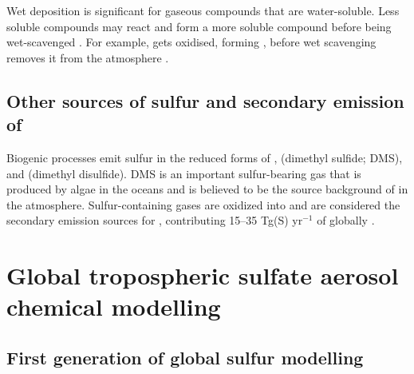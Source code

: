 Wet deposition is significant for gaseous compounds that are water-soluble. Less soluble compounds may react and form a more soluble compound before being wet-scavenged \citep{wayneChemistryAtmospheresIntroduction2006}. For example,  gets oxidised, forming , before wet scavenging removes it from the atmosphere \citep{seinfeldAtmosphericChemistryPhysics2016}.


\subsection{Other sources of sulfur and secondary emission of }
\label{ch1:other-so2}

Biogenic processes emit sulfur in the reduced forms of ,  (dimethyl sulfide; DMS), and  (dimethyl disulfide). DMS is an important sulfur-bearing gas that is produced by algae in the oceans and is believed to be the source background of  in the atmosphere. Sulfur-containing gases are oxidized into  and are considered the secondary emission sources for , contributing 15--35 Tg(S) yr$^{-1}$ of  globally \citep{lanaUpdatedClimatologySurface2011}.


\section{Global tropospheric sulfate aerosol chemical modelling} %
\label{section1.2}

\subsection{First generation of global sulfur modelling}

